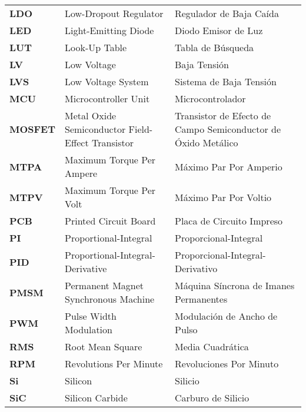 \begin{longtable}{>{\bfseries}p{3cm} p{5cm} p{5cm}}
\textbf{LDO} & Low-Dropout Regulator & Regulador de Baja Caída \\

\textbf{LED} & Light-Emitting Diode & Diodo Emisor de Luz \\

\textbf{LUT} & Look-Up Table & Tabla de Búsqueda \\

\textbf{LV} & Low Voltage & Baja Tensión \\

\textbf{LVS} & Low Voltage System & Sistema de Baja Tensión \\

\textbf{MCU} & Microcontroller Unit & Microcontrolador \\

\textbf{MOSFET} & Metal Oxide Semiconductor Field-Effect Transistor & Transistor de Efecto de Campo Semiconductor de Óxido Metálico \\

\textbf{MTPA} & Maximum Torque Per Ampere & Máximo Par Por Amperio \\

\textbf{MTPV} & Maximum Torque Per Volt & Máximo Par Por Voltio \\

\textbf{PCB} & Printed Circuit Board & Placa de Circuito Impreso \\

\textbf{PI} & Proportional-Integral & Proporcional-Integral \\

\textbf{PID} & Proportional-Integral-Derivative & Proporcional-Integral-Derivativo \\

\textbf{PMSM} & Permanent Magnet Synchronous Machine & Máquina Síncrona de Imanes Permanentes \\

\textbf{PWM} & Pulse Width Modulation & Modulación de Ancho de Pulso \\

\textbf{RMS} & Root Mean Square & Media Cuadrática \\

\textbf{RPM} & Revolutions Per Minute & Revoluciones Por Minuto \\

\textbf{Si} & Silicon & Silicio \\

\textbf{SiC} & Silicon Carbide & Carburo de Silicio \\


\end{longtable}

